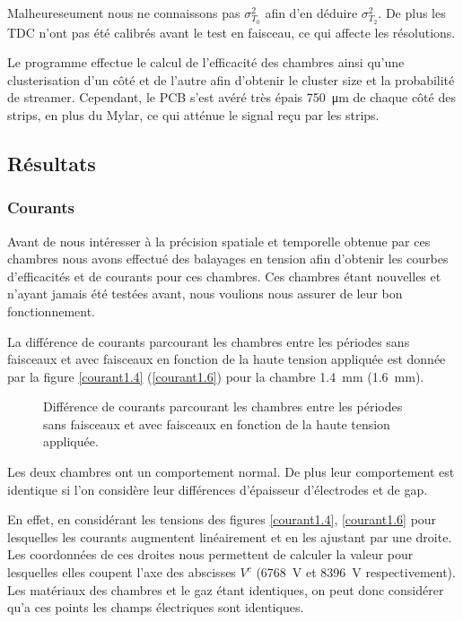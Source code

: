 Malheureseument nous ne connaissons pas $\sigma_{T_0}^2$ afin d'en déduire $\sigma_{T_2}^2$. De plus les TDC n'ont pas été calibrés avant le test en faisceau, ce qui affecte les résolutions.

Le programme effectue le calcul de l'efficacité des chambres ainsi  qu'une clusterisation d'un côté et de l'autre afin d'obtenir le cluster size et la probabilité de streamer. Cependant, le PCB s'est avéré très épais \SI{750}{\micro\meter} de chaque côté des strips, en plus du Mylar, ce qui atténue le signal reçu par les strips.

\subsection{Résultats}


\subsubsection{Courants}
Avant de nous intéresser à la précision spatiale et temporelle obtenue par ces chambres nous avons effectué des balayages en tension afin d'obtenir les courbes d'efficacités et de courants pour ces chambres. Ces chambres étant nouvelles et n'ayant jamais été testées avant, nous voulions nous assurer de leur bon fonctionnement.

La différence de courants parcourant les chambres entre les périodes sans faisceaux et avec faisceaux en fonction de la haute tension appliquée est donnée par la figure \ref{courant1.4} (\ref{courant1.6}) pour la chambre \SI{1.4}{\milli\meter} (\SI{1.6}{\milli\meter}).

\begin{figure}[ht!]
	\vspace{-0.5cm}
	\centering
	\caption{Différence de courants parcourant les chambres entre les périodes sans faisceaux et avec faisceaux en fonction de la haute tension appliquée.}
	\label{courant1.41.6}
\end{figure}

Les deux chambres ont un comportement normal. De plus leur comportement est identique si l'on considère leur différences d'épaisseur d'électrodes et de gap.

En effet, en considérant les tensions des figures \ref{courant1.4}, \ref{courant1.6} pour lesquelles les courants augmentent linéairement et en les ajustant par une droite. Les coordonnées de ces droites nous permettent de calculer la valeur pour lesquelles elles coupent l'axe des abscisses $V^c$ (\SI{6768}{\volt} et \SI{8396}{\volt} respectivement). Les matériaux des chambres et le gaz étant identiques, on peut donc considérer qu'a ces points les champs électriques sont identiques.

